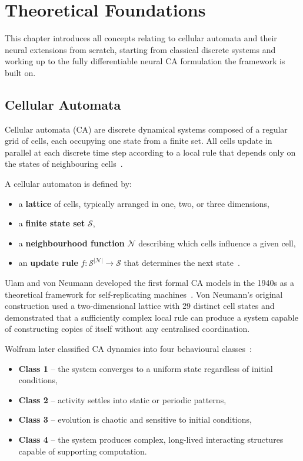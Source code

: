 \chapter{Theoretical Foundations}
\label{chap:theoretical-foundations}

This chapter introduces all concepts relating to cellular automata and their neural
extensions from scratch, starting from classical discrete systems and working up
to the fully differentiable neural CA formulation the framework is built on.

\section{Cellular Automata}

Cellular automata (CA) are discrete dynamical systems composed of a regular grid of cells, each occupying 
one state from a finite set. All cells update in parallel at each discrete time step according to a local 
rule that depends only on the states of neighbouring cells~\cite{MarinescuComplexSystems}.

A cellular automaton is defined by:
\begin{itemize}
    \item a \textbf{lattice} of cells, typically arranged in one, two, or three dimensions,
    \item a \textbf{finite state set} $\mathcal{S}$,
    \item a \textbf{neighbourhood function} $\mathcal{N}$ describing which cells influence a given cell,
    \item an \textbf{update rule} $f : \mathcal{S}^{|\mathcal{N}|} \rightarrow \mathcal{S}$ that determines the next state~\cite{IlachinskiCellular}.
\end{itemize}

Ulam and von Neumann developed the first formal CA models in the 1940s as a theoretical framework for 
self-replicating machines~\cite{VonNeumann1966}. Von Neumann's original construction used a two-dimensional 
lattice with 29 distinct cell states and demonstrated that a sufficiently complex local rule can produce 
a system capable of constructing copies of itself without any centralised coordination.

Wolfram later classified CA dynamics into four behavioural
classes~\cite{Wolfram1983, Wolfram2002}:

\begin{itemize}
    \item \textbf{Class 1} -- the system converges to a uniform state regardless of
          initial conditions,
    \item \textbf{Class 2} -- activity settles into static or periodic patterns,
    \item \textbf{Class 3} -- evolution is chaotic and sensitive to initial conditions,
    \item \textbf{Class 4} -- the system produces complex, long-lived interacting
          structures capable of supporting computation.
\end{itemize}

